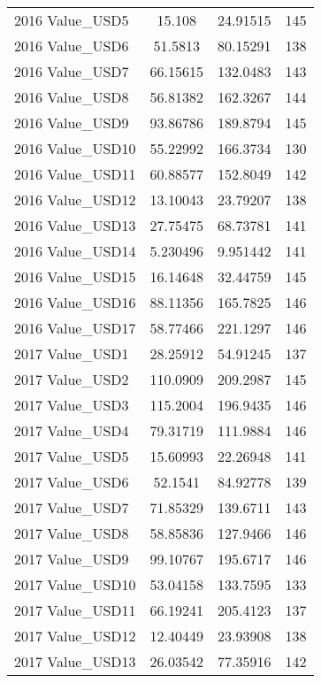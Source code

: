 {\begin{tabular}{l*{1}{ccc}}
2016 Value\_USD5     &      15.108&    24.91515&         145\\
2016 Value\_USD6     &     51.5813&    80.15291&         138\\
2016 Value\_USD7     &    66.15615&    132.0483&         143\\
2016 Value\_USD8     &    56.81382&    162.3267&         144\\
2016 Value\_USD9     &    93.86786&    189.8794&         145\\
2016 Value\_USD10    &    55.22992&    166.3734&         130\\
2016 Value\_USD11    &    60.88577&    152.8049&         142\\
2016 Value\_USD12    &    13.10043&    23.79207&         138\\
2016 Value\_USD13    &    27.75475&    68.73781&         141\\
2016 Value\_USD14    &    5.230496&    9.951442&         141\\
2016 Value\_USD15    &    16.14648&    32.44759&         145\\
2016 Value\_USD16    &    88.11356&    165.7825&         146\\
2016 Value\_USD17    &    58.77466&    221.1297&         146\\
2017 Value\_USD1     &    28.25912&    54.91245&         137\\
2017 Value\_USD2     &    110.0909&    209.2987&         145\\
2017 Value\_USD3     &    115.2004&    196.9435&         146\\
2017 Value\_USD4     &    79.31719&    111.9884&         146\\
2017 Value\_USD5     &    15.60993&    22.26948&         141\\
2017 Value\_USD6     &     52.1541&    84.92778&         139\\
2017 Value\_USD7     &    71.85329&    139.6711&         143\\
2017 Value\_USD8     &    58.85836&    127.9466&         146\\
2017 Value\_USD9     &    99.10767&    195.6717&         146\\
2017 Value\_USD10    &    53.04158&    133.7595&         133\\
2017 Value\_USD11    &    66.19241&    205.4123&         137\\
2017 Value\_USD12    &    12.40449&    23.93908&         138\\
2017 Value\_USD13    &    26.03542&    77.35916&         142\\

\end{tabular}}
